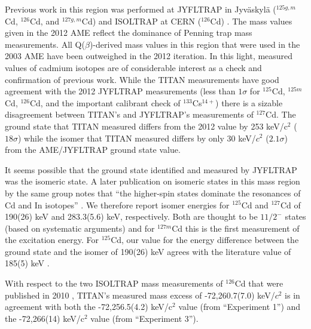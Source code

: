 \documentclass[twocolumn,prc,showpacs,preprintnumbers,amsmath,amssymb,superscriptaddress,nofootinbib,aps,10pt]{revtex4-1}
\begin{document}

Previous work in this region was performed at JYFLTRAP in Jyv\"{a}skyl\"{a} ($^{125g,m}$Cd, $^{126}$Cd, and $^{127g,m}$Cd) \cite{Hakala2012,Kankainen2013} and ISOLTRAP at CERN ($^{126}$Cd) \cite{Breitenfeldt2010b}. The mass values given in the 2012 AME \cite{Audi2012,Wang2012} reflect the dominance of Penning trap mass measurements. All Q($\beta$)-derived mass values in this region that were used in the 2003 AME \cite{Audi2003b,Wapstra2003b} have been outweighed in the 2012 iteration. In this light, measured values of cadmium isotopes are of considerable interest as a check and confirmation of previous work. While the TITAN measurements have good agreement with the 2012 JYFLTRAP measurements (less than $1\sigma$ for $^{125}$Cd, $^{125m}$Cd, $^{126}$Cd, and the important calibrant check of $^{133}$Cs$^{14+}$) there is a sizable disagreement between TITAN's and JYFLTRAP's measurements of $^{127}$Cd. The ground state that TITAN measured differs from the 2012 value by 253 keV/c$^2$ ($18\sigma$) while the isomer that TITAN measured differs by only 30 keV/$c^2$ ($2.1\sigma$) from the AME/JYFLTRAP ground state value. 

It seems possible that the ground state identified and measured by JYFLTRAP \cite{Hakala2012} was the isomeric state. A later publication on isomeric states in this mass region by the same group notes that ``the higher-spin states dominate the resonances of Cd and In isotopes'' \cite{Kankainen2013}. We therefore report isomer energies for $^{125}$Cd and $^{127}$Cd of 190(26) keV and 283.3(5.6) keV, respectively. Both are thought to be $11/2^{-}$ states (based on systematic arguments) and for $^{127m}$Cd this is the first measurement of the excitation energy. For $^{125}$Cd, our value for the energy difference between the ground state and the isomer of 190(26) keV agrees with the literature value of 185(5) keV \cite{Kankainen2013}.

With respect to the two ISOLTRAP mass measurements of $^{126}$Cd that were published in 2010 \cite{Breitenfeldt2010b}, TITAN's measured mass excess of -72,260.7(7.0) keV/$c^2$ is in agreement with both the -72,256.5(4.2) keV/c$^2$ value (from ``Experiment 1'') and the -72,266(14) keV/c$^2$ value (from ``Experiment 3'').
\end{document}
